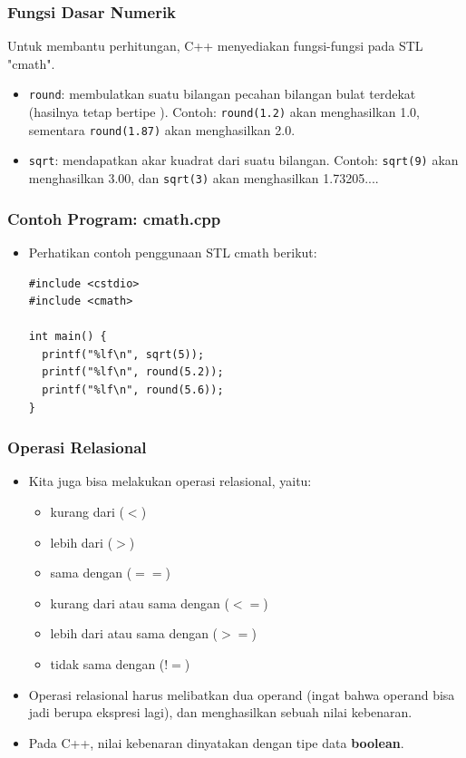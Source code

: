\begin{frame}
\frametitle{Fungsi Dasar Numerik}
Untuk membantu perhitungan, C++ menyediakan fungsi-fungsi pada STL "cmath".
\begin{itemize}
  \item \texttt{round}: membulatkan suatu bilangan pecahan bilangan bulat terdekat (hasilnya tetap bertipe ). Contoh: \texttt{round(1.2)} akan menghasilkan 1.0, sementara \texttt{round(1.87)} akan menghasilkan 2.0.
  \item \texttt{sqrt}: mendapatkan akar kuadrat dari suatu bilangan. Contoh: \texttt{sqrt(9)} akan menghasilkan 3.00, dan \texttt{sqrt(3)} akan menghasilkan 1.73205....
\end{itemize}
\end{frame}

\begin{frame}[fragile]
\frametitle{Contoh Program: cmath.cpp}
\begin{itemize}
  \item Perhatikan contoh penggunaan STL cmath berikut:
\begin{lstlisting}
#include <cstdio>
#include <cmath>

int main() {
  printf("%lf\n", sqrt(5));
  printf("%lf\n", round(5.2));
  printf("%lf\n", round(5.6));
}
\end{lstlisting}
\end{itemize}
\end{frame}

\begin{frame}
\frametitle{Operasi Relasional}
\begin{itemize}
  \item Kita juga bisa melakukan operasi relasional, yaitu:
  \begin{itemize}
    \item kurang dari ($<$)
    \item lebih dari ($>$)
    \item sama dengan ($==$)
    \item kurang dari atau sama dengan ($<=$)
    \item lebih dari atau sama dengan ($>=$)
    \item tidak sama dengan ($!=$)
  \end{itemize}
  \item Operasi relasional harus melibatkan dua operand (ingat bahwa operand bisa jadi berupa ekspresi lagi), dan menghasilkan sebuah nilai kebenaran.
  \item Pada C++, nilai kebenaran dinyatakan dengan tipe data \alert{\textbf{boolean}}.
\end{itemize}
\end{frame}

